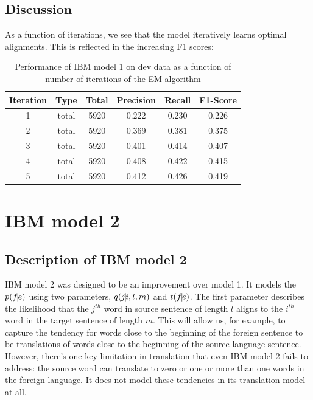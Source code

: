 \documentclass{article}
\begin{document}
	\subsection{Discussion}
	As a function of iterations, we see that the model iteratively learns optimal alignments. This is reflected in the increasing F1 scores:

	\begin{table}[htbp]
		\center
		\begin{tabular}{|c|c|c|c|c|c|}
			\hline
			Iteration&Type&Total&Precision&Recall&F1-Score\\
			\hline
			1&total&5920&    0.222 &       0.230 &       0.226\\
			\hline
			2&total&        5920&     0.369&        0.381&        0.375\\
			\hline
			3&total&        5920&    0.401&        0.414&        0.407\\
			\hline
			4&total&        5920&     0.408&        0.422&        0.415\\
			\hline
			5&total&        5920&     0.412&        0.426&        0.419\\
			\hline
		\end{tabular}
		\caption{Performance of IBM model 1 on dev data as a function of number of iterations of the EM algorithm}
	\end{table}
\section{IBM model 2}

	\subsection{Description of IBM model 2}
		IBM model 2 was designed to be an improvement over model 1. It models the $p(f\vline e)$ using two parameters, $q(j\vline i,l,m)$ and $t(f\vline e)$. The first parameter describes the likelihood that the $j^{th}$ word in source sentence of length $l$ aligns to the $i^{th}$ word in the target sentence of length $m$. This will allow us, for example, to capture the tendency for words close to the beginning of the foreign sentence to be translations of words close to the beginning of the source language sentence. 
		\\However, there's one key limitation in translation that even IBM model 2 fails to address: the source word can translate to zero or one or more than one words in the foreign language. It does not model these tendencies in its translation model at all.
\end{document}

